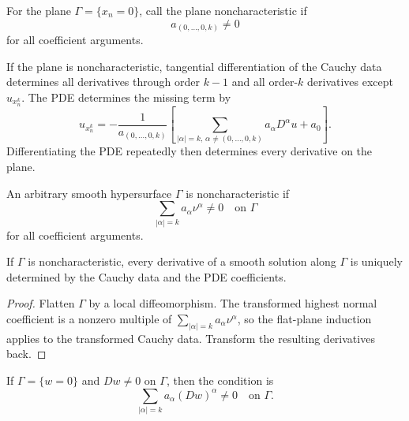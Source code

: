 \begin{definition}
\label{def:noncharacteristic-plane-flat}
For the plane $\Gamma=\{x_n=0\}$, call the plane noncharacteristic if
\[
a_{(0,\ldots,0,k)}\ne0
\]
for all coefficient arguments.
\end{definition}

If the plane is noncharacteristic, tangential differentiation of the Cauchy
data determines all derivatives through order $k-1$ and all order-$k$
derivatives except $u_{x_n^k}$. The PDE determines the missing term by
\[
u_{x_n^k}=-\frac1{a_{(0,\ldots,0,k)}}
\left[\sum_{|\alpha|=k,\,\alpha\ne(0,\ldots,0,k)}a_\alpha D^\alpha u+a_0\right].
\]
Differentiating the PDE repeatedly then determines every derivative on the
plane.

\begin{definition}
\label{def:noncharacteristic-surface}
An arbitrary smooth hypersurface $\Gamma$ is noncharacteristic if
\[
\sum_{|\alpha|=k}a_\alpha\nu^\alpha\ne0\quad\text{on }\Gamma
\]
for all coefficient arguments.
\end{definition}

\begin{theorem}
\label{thm:cauchy-data-noncharacteristic-surfaces}
If $\Gamma$ is noncharacteristic, every derivative of a smooth solution along
$\Gamma$ is uniquely determined by the Cauchy data and the PDE coefficients.
\end{theorem}

\begin{proof}
\sketch Flatten $\Gamma$ by a local diffeomorphism. The transformed highest
normal coefficient is a nonzero multiple of
$\sum_{|\alpha|=k}a_\alpha\nu^\alpha$, so the flat-plane induction applies to
the transformed Cauchy data. Transform the resulting derivatives back.
\end{proof}

\begin{remark}
\label{rem:noncharacteristic-condition-level-set}
If $\Gamma=\{w=0\}$ and $Dw\ne0$ on $\Gamma$, then the condition is
\[
\sum_{|\alpha|=k}a_\alpha(Dw)^\alpha\ne0\quad\text{on }\Gamma.
\]
\end{remark}

